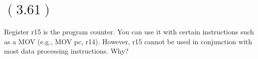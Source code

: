 \documentclass[letterpaper,12pt,titlepage]{article}
\begin{document}
\section*{$(3.61)$} Register r15 is the program counter. You can use it with certain instructions such as a MOV (e.g., MOV pc, r14). However, r15 cannot be used in conjunction with most data processing instructions. Why?

\begin{mdframed}[style=MyFrame]
\end{mdframed}



\end{document}
